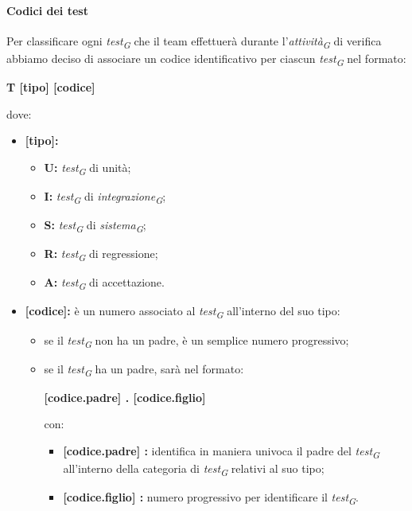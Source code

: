 \paragraph{Codici dei test}
Per classificare ogni \textit{test}\textsubscript{\textit{G}} che il team effettuerà durante l'\textit{attività}\textsubscript{\textit{G}} di verifica abbiamo deciso di associare un codice identificativo per ciascun \textit{test}\textsubscript{\textit{G}} nel formato: 

\begin{center}
    \textbf{T [tipo] [codice]}
\end{center}
dove:

\begin{itemize}
    \item \textbf{[tipo]:} 
        \begin{itemize}
            \item \textbf{U:} 
                \textit{test}\textsubscript{\textit{G}} di unità;
            \item \textbf{I:} 
                \textit{test}\textsubscript{\textit{G}} di \textit{integrazione}\textsubscript{\textit{G}};
            \item \textbf{S:} 
                \textit{test}\textsubscript{\textit{G}} di \textit{sistema}\textsubscript{\textit{G}};
            \item \textbf{R:} 
                \textit{test}\textsubscript{\textit{G}} di regressione;
            \item\textbf{A:} 
                \textit{test}\textsubscript{\textit{G}} di accettazione.
        \end{itemize}
    \item \textbf{[codice]:} 
        è un numero associato al \textit{test}\textsubscript{\textit{G}} all'interno del suo tipo: 
        \begin{itemize}
            \item 
                se il \textit{test}\textsubscript{\textit{G}} non ha un padre, è un semplice numero progressivo;
            \item 
                se il \textit{test}\textsubscript{\textit{G}} ha un padre, sarà nel formato:
                \begin{center}
                    \textbf{[codice.padre] . [codice.figlio]} 
                \end{center}
                con:
                \begin{itemize}
                    \item \textbf{[codice.padre] :} 
                        identifica in maniera univoca il padre del \textit{test}\textsubscript{\textit{G}} all'interno della categoria di \textit{test}\textsubscript{\textit{G}} relativi al suo tipo;
                    \item \textbf{[codice.figlio] :} 
                        numero progressivo per identificare il \textit{test}\textsubscript{\textit{G}}.
                \end{itemize}
        \end{itemize}
\end{itemize}

